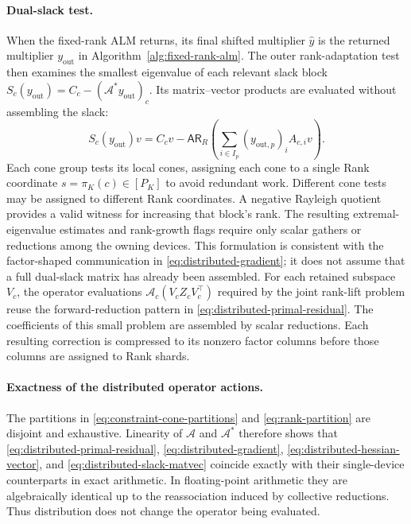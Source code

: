 \documentclass[11pt]{article}
\theoremstyle{definition}
\theoremstyle{remark}
\begin{document}
\paragraph{Dual-slack test.}
When the fixed-rank ALM returns, its final shifted multiplier $\widehat y$
is the returned multiplier $y_{\mathrm{out}}$ in
Algorithm~\ref{alg:fixed-rank-alm}.  The outer rank-adaptation test then
examines the smallest eigenvalue of each relevant slack block
$S_c(y_{\mathrm{out}})=C_c-(\mathcal A^*y_{\mathrm{out}})_c$.  Its
matrix--vector products are evaluated without assembling the slack:
\begin{equation}
    S_c(y_{\mathrm{out}})v
    =C_cv-
      \mathsf{AR}_{R}\!\left(
        \sum_{i\in I_p}(y_{\mathrm{out},p})_iA_{c,i}v
      \right).
\label{eq:distributed-slack-matvec}
\end{equation}
Each cone group tests its local cones, assigning each cone to a single Rank
coordinate $s=\pi_K(c)\in[P_K]$ to avoid redundant work.  Different cone
tests may be assigned to different Rank coordinates.  A negative Rayleigh
quotient provides a valid witness for increasing that block's rank.  The
resulting extremal-eigenvalue estimates and rank-growth flags require only
scalar gathers or reductions among the owning devices.  This formulation is
consistent with the factor-shaped communication in
\eqref{eq:distributed-gradient}; it does not assume that a full dual-slack
matrix has already been assembled.
For each retained subspace $V_c$, the operator evaluations
$\mathcal A_c(V_cZ_cV_c^\top)$ required by the joint rank-lift problem reuse
the forward-reduction pattern in
\eqref{eq:distributed-primal-residual}.  The coefficients of this small
problem are assembled by scalar reductions.  Each resulting correction is
compressed to its nonzero factor columns before those columns are assigned to
Rank shards.

\paragraph{Exactness of the distributed operator actions.}
The partitions in \eqref{eq:constraint-cone-partitions} and
\eqref{eq:rank-partition} are disjoint and exhaustive.  Linearity of
$\mathcal A$ and $\mathcal A^*$ therefore shows that
\eqref{eq:distributed-primal-residual},
\eqref{eq:distributed-gradient},
\eqref{eq:distributed-hessian-vector}, and
\eqref{eq:distributed-slack-matvec} coincide exactly with their single-device
counterparts in exact arithmetic.  In floating-point arithmetic they are
algebraically identical up to the reassociation induced by collective
reductions.  Thus distribution does not change the operator being evaluated.
\end{document}

